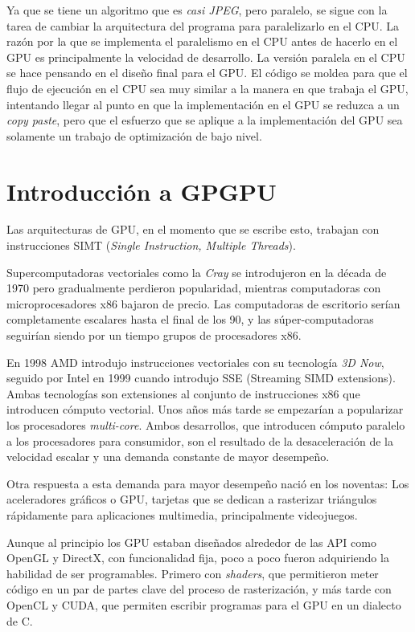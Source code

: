 Ya que se tiene un algoritmo que es \emph{casi JPEG}, pero paralelo, se sigue
con la tarea de cambiar la arquitectura del programa para paralelizarlo en el
CPU. La razón por la que se implementa el paralelismo en el CPU antes de
hacerlo en el GPU es principalmente la velocidad de desarrollo. La versión
paralela en el CPU se hace pensando en el diseño final para el GPU.  El
código se moldea para que el flujo de ejecución en el CPU sea muy similar a la
manera en que trabaja el GPU, intentando llegar al punto en que la
implementación en el GPU se reduzca a un \emph{copy paste}, pero que el esfuerzo
que se aplique a la implementación del GPU sea solamente un trabajo de
optimización de bajo nivel.

\section{Introducción a GPGPU} \label{sec:gpgpu}

Las arquitecturas de GPU, en el momento que se escribe esto, trabajan con
instrucciones SIMT (\emph{Single Instruction, Multiple Threads}).

Supercomputadoras vectoriales como la \emph{Cray} se introdujeron en la década
de 1970 pero gradualmente perdieron popularidad, mientras computadoras con
microprocesadores x86 bajaron de precio. Las computadoras de escritorio serían
completamente escalares hasta el final de los 90, y las súper-computadoras
seguirían siendo por un tiempo grupos de procesadores x86.

En 1998 AMD introdujo instrucciones vectoriales con su tecnología \emph{3D
Now}, seguido por Intel en 1999 cuando introdujo SSE (Streaming SIMD
extensions). Ambas tecnologías son extensiones al conjunto de instrucciones x86
que introducen cómputo vectorial. Unos años más tarde se empezarían a
popularizar los procesadores \emph{multi-core}. Ambos desarrollos, que
introducen cómputo paralelo a los procesadores para consumidor, son el resultado
de la desaceleración de la velocidad escalar y una demanda constante de mayor desempeño.

Otra respuesta a esta demanda para mayor desempeño nació en los noventas: Los
aceleradores gráficos o GPU, tarjetas que se dedican a rasterizar triángulos
rápidamente para aplicaciones multimedia, principalmente videojuegos.

Aunque al principio los GPU estaban diseñados alrededor de  las API como OpenGL y
DirectX, con funcionalidad fija, poco a poco fueron adquiriendo la habilidad de
ser programables. Primero con \emph{shaders}, que permitieron meter código en
un par de partes clave del proceso de rasterización, y más tarde con OpenCL y
CUDA, que permiten escribir programas para el GPU en un dialecto de C.

